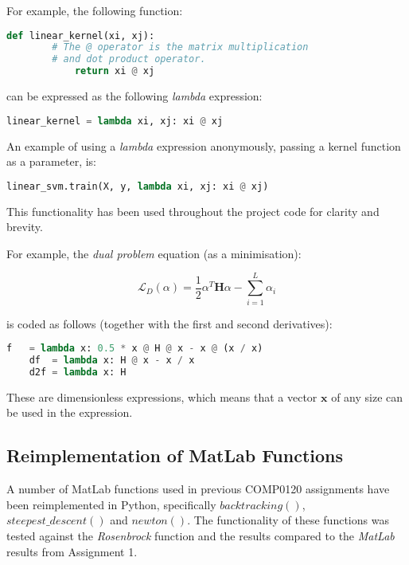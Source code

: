 \documentclass[10pt, a4paper,reqno]{amsart}
\begin{document}
For example, the following function:

\begin{lstlisting}[language=Python]
	def linear_kernel(xi, xj):
		# The @ operator is the matrix multiplication
		# and dot product operator.
    		return xi @ xj
\end{lstlisting}

can be expressed as the following \emph{lambda} expression:

\begin{lstlisting}[language=Python]
	linear_kernel = lambda xi, xj: xi @ xj
\end{lstlisting}

An example of using a \emph{lambda} expression anonymously, passing a kernel function as a parameter, is:

\begin{lstlisting}[language=Python]
	linear_svm.train(X, y, lambda xi, xj: xi @ xj)
\end{lstlisting}

This functionality has been used throughout the project code for clarity and brevity.

For example, the \emph{dual problem} equation (as a minimisation):

\begin{equation}
\mathcal{L}_D(\alpha) = \frac{1}{2}\alpha^T\mathbf{H}\alpha - \sum_{i=1}^{L}\alpha_i
\end{equation}

is coded as follows (together with the first and second derivatives):

\begin{lstlisting}[language=Python]
    f   = lambda x: 0.5 * x @ H @ x - x @ (x / x)
    df  = lambda x: H @ x - x / x
    d2f = lambda x: H 
\end{lstlisting}

These are dimensionless expressions, which means that a vector $\mathbf{x}$ of any size can be used in the expression.

\subsection{Reimplementation of MatLab Functions}

A number of MatLab functions used in previous COMP0120 assignments have been reimplemented in Python, specifically $backtracking()$, $steepest\_descent()$ and $newton()$. The functionality of these functions was tested against the \emph{Rosenbrock} function and the results compared to the \emph{MatLab} results from Assignment 1.
\end{document}
